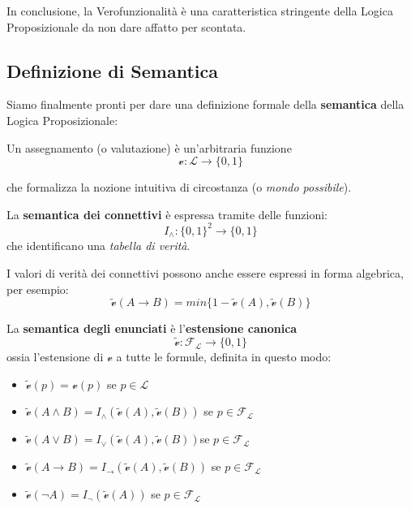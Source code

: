 In conclusione, la Verofunzionalità è una caratteristica stringente della Logica Proposizionale da non dare affatto per scontata.

\subsection{Definizione di Semantica}
Siamo finalmente pronti per dare una definizione formale della 
\textbf{semantica} della Logica Proposizionale: 
\begin{defi}
Un assegnamento (o valutazione) è un'arbitraria funzione 
$$
\mathcal{v} : \mathscr{L} \rightarrow \{0,1\}
$$ 
\end{defi}
che formalizza la nozione intuitiva di circostanza (o \textit{mondo possibile}). 

\begin{defi}
        La \textbf{semantica dei connettivi} è espressa tramite delle funzioni:
$$
I_{\land} : \{0,1\}^2 \rightarrow \{0,1\}
$$
che identificano una \textit{tabella di verità}.
\end{defi}
I valori di verità dei connettivi possono anche essere espressi in forma algebrica, per esempio:
$$
\widetilde{\mathcal{v}}(A \rightarrow B) = min\{1-\widetilde{\mathcal{v}}(A), \widetilde{\mathcal{v}}(B)\}
$$

\begin{defi}
        La \textbf{semantica degli enunciati} è l'\textbf{estensione canonica}
$$
\widetilde{\mathcal{v}}: \mathscr{F_L} \rightarrow \{0,1\}
$$
ossia l'estensione di $\mathcal{v}$ a tutte le formule, definita in questo modo: 
\begin{itemize}
  \item $\widetilde{\mathcal{v}}(p) = \mathcal{v}(p)$ se $p \in \mathscr{L}$
  \item $\widetilde{\mathcal{v}}(A \land B) = I_{\land}(\widetilde{\mathcal{v}}(A), \widetilde{\mathcal{v}}(B))$ se $p \in \mathscr{F_L}$
  \item $\widetilde{\mathcal{v}}(A \lor B) = I_{\lor}(\widetilde{\mathcal{v}}(A), \widetilde{\mathcal{v}}(B))$se $p \in \mathscr{F_L}$
  \item $\widetilde{\mathcal{v}}(A \rightarrow B) = I_{\rightarrow}(\widetilde{\mathcal{v}}(A), \widetilde{\mathcal{v}}(B))$ se $p \in \mathscr{F_L}$
  \item $\widetilde{\mathcal{v}}(\neg A) = I_{\neg}(\widetilde{\mathcal{v}}(A))$ se $p \in \mathscr{F_L}$
\end{itemize}
\end{defi}

